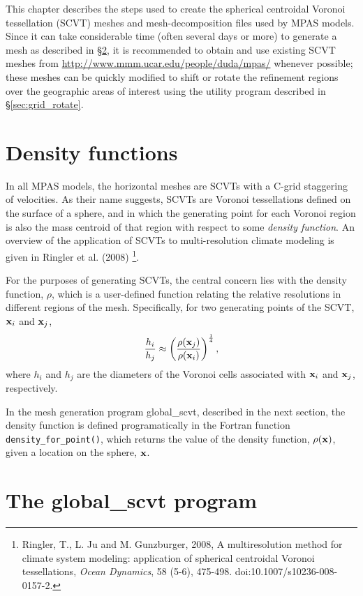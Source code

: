 
This chapter describes the steps used to create the  spherical centroidal Voronoi tessellation (SCVT) meshes and mesh-decomposition files used by MPAS models.
Since it can take considerable time (often several days or more) to generate a mesh as described in \S \ref{sec:global_scvt}, it is recommended to obtain 
and use existing SCVT meshes from \url{http://www.mmm.ucar.edu/people/duda/mpas/} whenever possible; these meshes can be quickly
modified to shift or rotate the refinement regions over the geographic areas of interest using the utility program described in \S \ref{sec:grid_rotate}.

\section{Density functions}

In all MPAS models, the horizontal meshes are SCVTs with a C-grid staggering of
velocities. As their name suggests, SCVTs are Voronoi tessellations defined on the surface of a sphere, and in which the generating 
point for each Voronoi region is also the mass centroid of that region with respect to some {\em density function}. An overview of
the application of SCVTs to multi-resolution climate modeling is given in Ringler et al. (2008)
\footnote{Ringler, T., L. Ju and M. Gunzburger, 2008, A multiresolution method for climate system modeling: application of spherical centroidal Voronoi tessellations, {\em Ocean Dynamics}, 58 (5-6), 475-498. doi:10.1007/s10236-008-0157-2.}.

For the purposes of generating SCVTs, the central concern lies with the density function, $\rho$, which is a user-defined
function relating the relative resolutions in different regions of the mesh. Specifically, for two generating points of the 
SCVT, ${\bf x}_i$ and ${\bf x}_j$,
\[
{h_i \over h_j} \approx \left({\rho({\bf x}_j) \over \rho({\bf x}_i)} \right)^{1 \over 4},
\]
where $h_i$ and $h_j$ are the diameters of the Voronoi cells associated with ${\bf x}_i$ and ${\bf x}_j$, respectively.

In the mesh generation program global\_scvt, described in the next section, the density function is defined programatically in the Fortran function
{\tt density\_for\_point()}, which returns the value of the density function, $\rho({\bf x})$, given a location on the sphere, ${\bf x}$.
   
\section{The global\_scvt program}
\label{sec:global_scvt}


